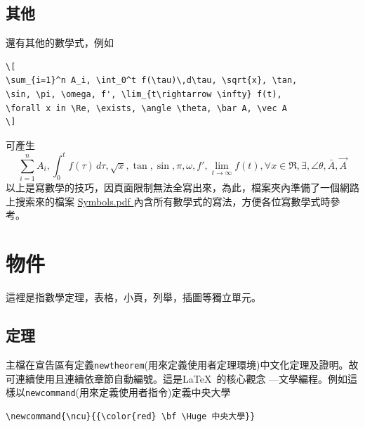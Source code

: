 \subsection{其他}
還有其他的數學式，例如\\
\begin{Verbatim}[frame=single,firstline=1,label=Various math forms]
\[
\sum_{i=1}^n A_i, \int_0^t f(\tau)\,d\tau, \sqrt{x}, \tan, 
\sin, \pi, \omega, f', \lim_{t\rightarrow \infty} f(t),
\forall x in \Re, \exists, \angle \theta, \bar A, \vec A
\]
\end{Verbatim}
可產生   
\[
\sum_{i=1}^n A_i,  \int_0^t f(\tau)\,d\tau, \sqrt{x}, \tan, \sin, \pi, \omega, f',
\lim_{t\rightarrow \infty} f(t),
\forall x \in \Re, \exists, \angle \theta, \bar A, \vec A
\]
以上是寫數學的技巧，因頁面限制無法全寫出來，為此，檔案夾內準備了一個網路上搜索來的檔案
\href{./Symbols.pdf}{ Symbols.pdf }內含所有數學式的寫法，方便各位寫數學式時參考。

\section{物件}
這裡是指數學定理，表格，小頁，列舉，插圖等獨立單元。

\subsection{定理}
主檔在宣告區有定義{\tt newtheorem}(用來定義使用者定理環境)中文化定理及證明。故可連續使用且連續依章節自動編號。這是\LaTeX\ 的核心觀念 ---文學編程。例如這樣以{\tt newcommand}(用來定義使用者指令)定義中央大學

\begin{Verbatim}[frame=single,firstline=1,label=Simple macro without parameters]
\newcommand{\ncu}{{\color{red} \bf \Huge 中央大學}}
\end{Verbatim}

